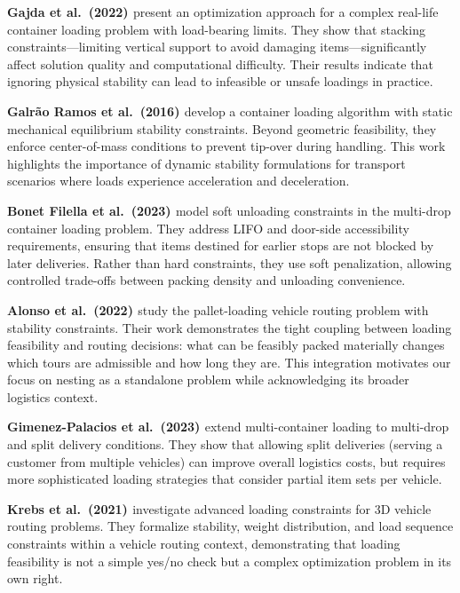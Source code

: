 \textbf{Gajda et al.\ (2022) \cite{GTMP22}} present an optimization approach for a complex real-life container loading problem with load-bearing limits. They show that stacking constraints---limiting vertical support to avoid damaging items---significantly affect solution quality and computational difficulty. Their results indicate that ignoring physical stability can lead to infeasible or unsafe loadings in practice.

\textbf{Galrão Ramos et al.\ (2016) \cite{GOGL16}} develop a container loading algorithm with static mechanical equilibrium stability constraints. Beyond geometric feasibility, they enforce center-of-mass conditions to prevent tip-over during handling. This work highlights the importance of dynamic stability formulations for transport scenarios where loads experience acceleration and deceleration.

\textbf{Bonet Filella et al.\ (2023) \cite{BTC23}} model soft unloading constraints in the multi-drop container loading problem. They address LIFO and door-side accessibility requirements, ensuring that items destined for earlier stops are not blocked by later deliveries. Rather than hard constraints, they use soft penalization, allowing controlled trade-offs between packing density and unloading convenience.

\textbf{Alonso et al.\ (2022) \cite{AMSAVP22}} study the pallet-loading vehicle routing problem with stability constraints. Their work demonstrates the tight coupling between loading feasibility and routing decisions: what can be feasibly packed materially changes which tours are admissible and how long they are. This integration motivates our focus on nesting as a standalone problem while acknowledging its broader logistics context.

\textbf{Gimenez-Palacios et al.\ (2023) \cite{GPAAVP23}} extend multi-container loading to multi-drop and split delivery conditions. They show that allowing split deliveries (serving a customer from multiple vehicles) can improve overall logistics costs, but requires more sophisticated loading strategies that consider partial item sets per vehicle.

\textbf{Krebs et al.\ (2021) \cite{KEK21}} investigate advanced loading constraints for 3D vehicle routing problems. They formalize stability, weight distribution, and load sequence constraints within a vehicle routing context, demonstrating that loading feasibility is not a simple yes/no check but a complex optimization problem in its own right.

